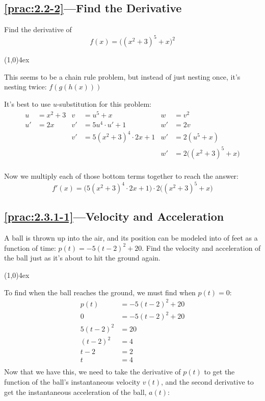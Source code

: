 \documentclass{MathNotes}
\newcommand{\br}{
	\begin{center}
		\line(1,0){4ex}
	\end{center}}
\begin{document}
\subsection*{\ref{prac:2.2-2}---Find the Derivative}\label{ans:2.2-2}
Find the derivative of $$f(x)=\big((x^2+3)^5+x\big)^2$$
\br
This seems to be a chain rule problem, but instead of just nesting once,
it's nesting twice: $f(g(h(x)))$

It's best to use $u$-substitution for this problem:
\begin{align*}
	u  & =x^2+3 & v  & =u^5+x                & w  & =v^2                    \\
	u' & =2x    & v' & =5u^4\cdot u'+1       & w' & =2v                     \\
	   &        & v' & =5(x^2+3)^4\cdot 2x+1 & w' & =2(u^5+x)               \\
	   &        &    &                       & w' & =2\big((x^2+3)^5+x\big) \\
\end{align*}

Now we multiply each of those bottom terms together to reach the answer:
$$f'(x)=\big(5(x^2+3)^4\cdot 2x+1\big)\cdot2\big((x^2+3)^5+x\big)$$

\newpage
\subsection*{\ref{prac:2.3.1-1}---Velocity and Acceleration}\label{ans:2.3.1-1}
A ball is thrown up into the air, and its position can be modeled into
of feet as a function of time: $p(t)=-5(t-2)^2+20$. Find the velocity and
acceleration of the ball just as it's about to hit the ground again.
\br
To find when the ball reaches the ground, we must find when $p(t)=0$:
\begin{align*}
	p(t)     & =-5(t-2)^2+20 \\
	0        & =-5(t-2)^2+20 \\
	5(t-2)^2 & =20           \\
	(t-2)^2  & =4            \\
	t-2      & =2            \\
	t        & =4            \\
\end{align*}
Now that we have this, we need to take the derivative of $p(t)$ to get the
function of the ball's instantaneous velocity $v(t)$, and the second derivative
to get the instantaneous acceleration of the ball, $a(t)$:
\end{document}
